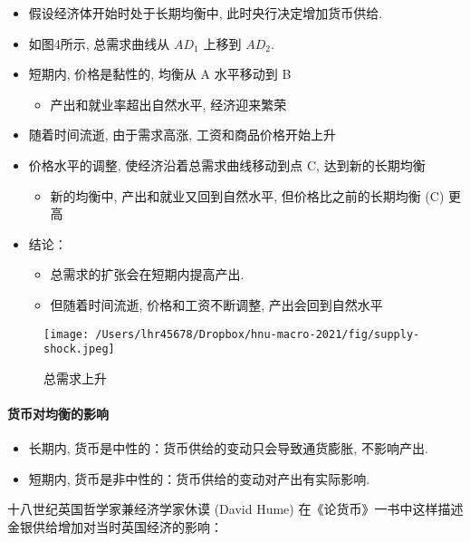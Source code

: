 \documentclass[10pt]{ctexart}
\begin{document}
\begin{itemize}
\item
  假设经济体开始时处于长期均衡中, 此时央行决定增加货币供给. 
\item
  如图4所示, 总需求曲线从 $AD_1$ 上移到 $AD_2$. 
\item
  短期内, 价格是黏性的, 均衡从 A 水平移动到 B
  \begin{itemize}
  \item
    产出和就业率超出自然水平, 经济迎来繁荣
  \end{itemize}
\item
  随着时间流逝, 由于需求高涨, 工资和商品价格开始上升
\item
  价格水平的调整, 使经济沿着总需求曲线移动到点 C,  达到新的长期均衡

  \begin{itemize}
  \item
    新的均衡中, 产出和就业又回到自然水平, 但价格比之前的长期均衡 (C)
    更高
  \end{itemize}
\item 结论：
  \begin{itemize}
  \item 总需求的扩张会在短期内提高产出. 
  \item 但随着时间流逝, 价格和工资不断调整, 产出会回到自然水平
  \end{itemize}

  
\end{itemize}

\begin{figure}
\centering
\texttt{[image: /Users/lhr45678/Dropbox/hnu-macro-2021/fig/supply-shock.jpeg]}
\caption{总需求上升}
\end{figure}



\paragraph{货币对均衡的影响}


\begin{itemize}
\item
  长期内, 货币是中性的：货币供给的变动只会导致通货膨胀, 不影响产出.
\item
  短期内, 货币是非中性的：货币供给的变动对产出有实际影响.
\end{itemize}

十八世纪英国哲学家兼经济学家休谟 (David Hume)
在《论货币》一书中这样描述金银供给增加对当时英国经济的影响：
\end{document}
